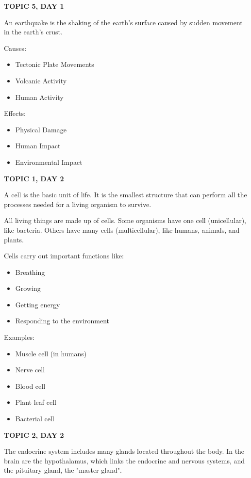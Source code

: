 {{{\textbf{TOPIC 5, DAY 1}


An earthquake is the shaking of the earth's surface caused by sudden movement in the earth's crust. 


Causes:
\begin{itemize}
    \item Tectonic Plate Movements 
    \item Volcanic Activity 
    \item Human Activity 
\end{itemize}


Effects: 
\begin{itemize}
    \item Physical Damage 
    \item Human Impact 
    \item Environmental Impact
\end{itemize}

\textbf{TOPIC 1, DAY 2}


A cell is the basic unit of life. It is the smallest structure that can perform all the processes needed for a living organism to survive.


All living things are made up of cells.
Some organisms have one cell (unicellular), like bacteria.
Others have many cells (multicellular), like humans, animals, and plants.


Cells carry out important functions like:
\begin{itemize}
    \item Breathing
    \item Growing
    \item Getting energy
    \item Responding to the environment
\end{itemize}


Examples:
\begin{itemize}
    \item Muscle cell (in humans)
    \item Nerve cell
    \item Blood cell
    \item Plant leaf cell
    \item Bacterial cell
\end{itemize}

\textbf{TOPIC 2, DAY 2}


The endocrine system includes many glands located throughout the body. In the brain are the hypothalamus, which links the endocrine and nervous systems, and the pituitary gland, the "master gland".

}}}
